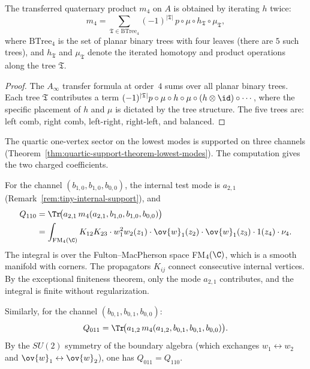 \begin{theorem}
The transferred quaternary product $m_4$ on $A$ is obtained by iterating $h$ twice:
\begin{equation}
m_4 = \sum_{\mathfrak{T} \in \mathrm{BTree}_4}
(-1)^{|\mathfrak{T}|} \,
p \circ \mu \circ h_{\mathfrak{T}} \circ \mu_{\mathfrak{T}},
\end{equation}
where $\mathrm{BTree}_4$ is the set of planar binary trees with four leaves (there are
$5$ such trees), and $h_{\mathfrak{T}}$ and $\mu_{\mathfrak{T}}$ denote the
iterated homotopy and product operations along the tree $\mathfrak{T}$.
\end{theorem}

\begin{proof}
The $A_\infty$ transfer formula at order~$4$ sums over all planar binary trees.
Each tree $\mathfrak{T}$ contributes a term
$(-1)^{|\mathfrak{T}|} p \circ \mu \circ h \circ \mu \circ (h \otimes \id) \circ \cdots$,
where the specific placement of $h$ and $\mu$ is dictated by the tree structure.
The five trees are: left comb, right comb, left-right, right-left, and balanced.
\end{proof}

\begin{computation}
The quartic one-vertex sector on the lowest modes is supported on three channels
(Theorem~\ref{thm:quartic-support-theorem-lowest-modes}). The computation gives the two charged
coefficients.

For the channel $(b_{1,0}, b_{1,0}, b_{0,0})$, the internal test mode is $a_{2,1}$
(Remark~\ref{rem:tiny-internal-support}), and
\begin{align}
Q_{110}
&= \Tr\!\bigl(a_{2,1}\, m_4(a_{2,1}, b_{1,0}, b_{1,0}, b_{0,0})\bigr)
\\
&= \int_{\mathrm{FM}_4(\C)}
K_{12} K_{23} \cdot w_1^2 w_2(z_1) \cdot
\ov{w}_1(z_2) \cdot \ov{w}_1(z_3) \cdot 1(z_4) \cdot
\nu_4.
\notag
\end{align}
The integral is over the Fulton--MacPherson space FM$_4(\C)$, which is a smooth
manifold with corners. The propagators $K_{ij}$ connect consecutive internal
vertices. By the exceptional finiteness theorem, only the mode $a_{2,1}$ contributes,
and the integral is finite without regularization.

Similarly, for the channel $(b_{0,1}, b_{0,1}, b_{0,0})$:
\begin{equation}
Q_{011}
= \Tr\!\bigl(a_{1,2}\, m_4(a_{1,2}, b_{0,1}, b_{0,1}, b_{0,0})\bigr).
\end{equation}
By the $SU(2)$ symmetry of the boundary algebra (which exchanges
$w_1 \leftrightarrow w_2$ and $\ov{w}_1 \leftrightarrow \ov{w}_2$), one has
$Q_{011} = Q_{110}$.
\end{computation}


